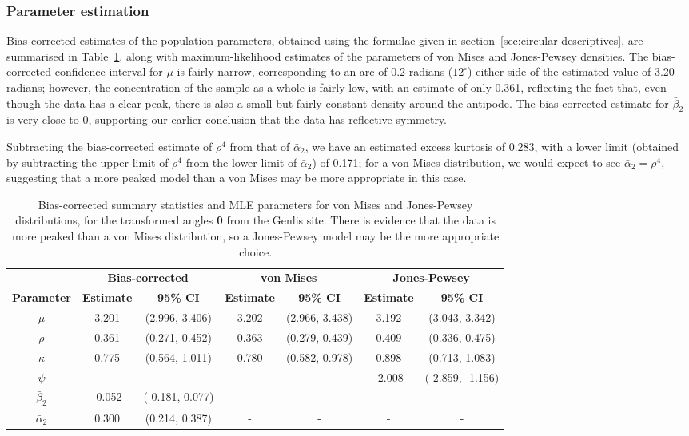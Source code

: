 \documentclass[../../ArchStats.tex]{subfiles}
\begin{document}
\subsubsection{Parameter estimation}
Bias-corrected estimates of the population parameters, obtained using the formulae given in section~\ref{sec:circular-descriptives}, are summarised in Table~\ref{tab:Genlis-statistics}, along with maximum-likelihood estimates of the parameters of von Mises and Jones-Pewsey densities. The bias-corrected confidence interval for $\mu$ is fairly narrow, corresponding to an arc of 0.2 radians ($12^\circ$) either side of the estimated value of 3.20 radians; however, the concentration of the sample as a whole is fairly low, with an estimate of only 0.361, reflecting the fact that, even though the data has a clear peak, there is also a small but fairly constant density around the antipode. The bias-corrected estimate for $\bar{\beta}_2$ is very close to 0, supporting our earlier conclusion that the data has reflective symmetry. 

Subtracting the bias-corrected estimate of $\rho^4$ from that of $\bar{\alpha}_2$, we have an estimated excess kurtosis of 0.283, with a lower limit (obtained by subtracting the upper limit of $\rho^4$ from the lower limit of $\bar{\alpha}_2$) of 0.171; for a von Mises distribution, we would expect to see $\bar{\alpha}_2 = \rho^4$, suggesting that a more peaked model than a von Mises may be more appropriate in this case.

\begin{table}[!ht]
\footnotesize
\centering
\caption{Bias-corrected summary statistics and MLE parameters for von Mises and Jones-Pewsey distributions, for the transformed angles $\boldsymbol{\theta}$ from the Genlis site. There is evidence that the data is more peaked than a von Mises distribution, so a Jones-Pewsey model may be the more appropriate choice.}
\label{tab:Genlis-statistics}
\begin{tabular}{c|cc|cc|cc}
\hline 
 & \multicolumn{2}{c|}{\textbf{Bias-corrected}} & \multicolumn{2}{c|}{\textbf{von Mises}} & \multicolumn{2}{c}{\textbf{Jones-Pewsey}} \\
\textbf{Parameter} & \textbf{Estimate} & \textbf{95\% CI} & \textbf{Estimate} & \textbf{95\% CI} & \textbf{Estimate} & \textbf{95\% CI} \\
\hline
$\mu$ & 3.201 & (2.996, 3.406) & 3.202 & (2.966, 3.438) & 3.192 & (3.043, 3.342) \\ 
$\rho$ & 0.361 & (0.271, 0.452) & 0.363 & (0.279, 0.439) & 0.409 & (0.336, 0.475) \\ 
$\kappa$ & 0.775 & (0.564, 1.011) & 0.780 & (0.582, 0.978) & 0.898 & (0.713, 1.083) \\ 
$\psi$ & - & - & - & - & -2.008 & (-2.859, -1.156) \\ 
$\bar{\beta}_2$ & -0.052 & (-0.181, 0.077) & - & - & - & - \\ 
$\bar{\alpha}_2 $ & 0.300 & (0.214, 0.387) & - & - & - & - \\ 
\hline
\end{tabular}
\end{table}
\end{document}
